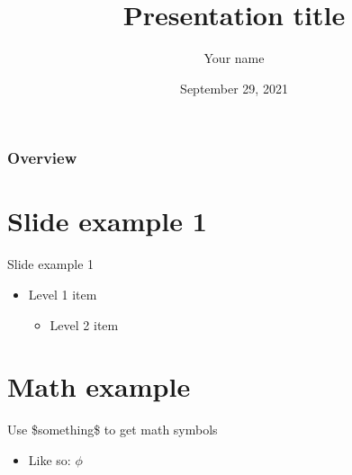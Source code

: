 \documentclass{beamer}
\title[Presentation title]{Presentation title} %
\author{Your name}
\institute[Institution for other slides]
{
    Institution for title slide \\
    \medskip
}
\date{September 29, 2021}
\begin{document}
\begin{frame}
    \titlepage %
\end{frame}

\begin{frame}
    \frametitle{Overview} %
    \tableofcontents %
\end{frame}



\section{Slide example 1}
\begin{frame}{Slide example 1}
    \begin{itemize}
        \item Level 1 item
        \begin{itemize}
            \item Level 2 item
        \end{itemize}
    \end{itemize}
\end{frame}


\section{Math example}
\begin{frame}{Use \$something\$ to get math symbols}
    \begin{itemize}
        \item Like so: $\phi$
    \end{itemize}
\end{frame}
\end{document}

